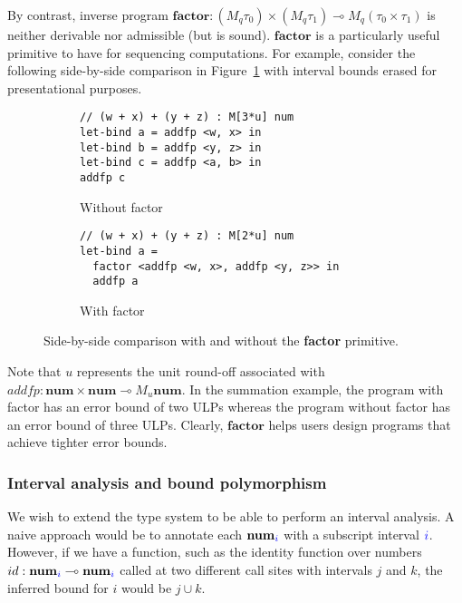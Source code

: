 By contrast, inverse program $\textbf{factor}: (M_q \tau_0) \times (M_q \tau_1)
\multimap M_q (\tau_0 \times \tau_1)$ is neither derivable nor admissible (but
is sound). $\textbf{factor}$ is a particularly useful primitive to have for
sequencing computations. For example, consider the following side-by-side
comparison in Figure~\ref{fig:factor-side-by-side} with interval bounds erased
for presentational purposes.

\begin{figure}[ht]
\centering

\begin{subfigure}[t]{0.48\textwidth}
\begin{lstlisting}
// (w + x) + (y + z) : M[3*u] num 
let-bind a = addfp <w, x> in
let-bind b = addfp <y, z> in
let-bind c = addfp <a, b> in
addfp c 
\end{lstlisting}
\caption{Without factor}
\end{subfigure}
\hfill
\begin{subfigure}[t]{0.48\textwidth}
\begin{lstlisting}
// (w + x) + (y + z) : M[2*u] num 
let-bind a = 
  factor <addfp <w, x>, addfp <y, z>> in
  addfp a
\end{lstlisting}
\caption{With factor}
\end{subfigure}

\caption{Side-by-side comparison with and without the \textbf{factor} primitive.}
\label{fig:factor-side-by-side}
\end{figure}
Note that $u$ represents the unit round-off associated with $addfp :
\textbf{num} \times \textbf{num} \multimap M_u \textbf{num}$. In the summation
example, the program with factor has an error bound of two ULPs whereas the
program without factor has an error bound of three ULPs. Clearly,
$\textbf{factor}$ helps users design programs that achieve tighter error bounds.

\subsubsection*{Interval analysis and bound polymorphism}
We wish to extend the type system to be able to perform an interval analysis. A
naive approach would be to annotate each $\textbf{num}_{\textcolor{blue}{i}}$ with a
subscript interval $\textcolor{blue}{i}$. However, if we have a function, such as the
identity function over numbers $id : \textbf{num}_{\textcolor{blue}{i}} \multimap
\textbf{num}_{\textcolor{blue}{i}}$ called at two different call sites with intervals $j$
and $k$, the inferred bound for $i$ would be $j \cup k$.

